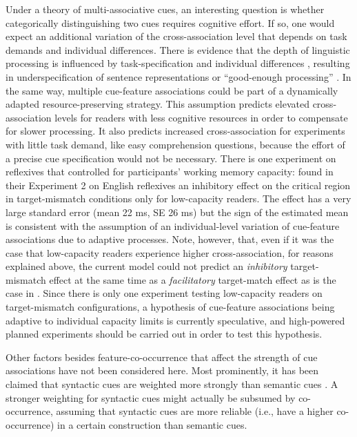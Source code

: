 \documentclass{cambridge7A}\usepackage[]{graphicx}\usepackage[]{color}
\begin{document}
Under a theory of multi-associative cues, an interesting question is whether categorically distinguishing two cues requires cognitive effort. If so, one would expect an additional variation of the cross-association level that depends on task demands and individual differences.
There is evidence that the depth of linguistic processing is influenced by task-specification \citep{SwetsDesmetClifton2008,LogacevVasishth2015} and individual differences \citep{Traxler2007,MalsburgVasishth2013,NicenboimEtAlFrontiers2016Capacity}, resulting in underspecification of sentence representations or ``good-enough processing'' \citep{FerreiraFerraroBailey2002}.
In the same way, multiple cue-feature associations could be part of a dynamically adapted resource-preserving strategy. 
This assumption predicts elevated cross-association levels for readers with less cognitive resources in order to compensate for slower processing. It also predicts increased cross-association for experiments with little task demand, like easy comprehension questions, because the effort of a precise cue specification would not be necessary.
There is one experiment on reflexives that controlled for participants' working memory capacity: \cite{CunningsFelser2013} found in their Experiment 2 on English reflexives an inhibitory effect on the critical region in target-mismatch conditions only for low-capacity readers. The effect has a very large standard error (mean 22 ms, SE 26 ms) but the sign of the estimated mean is consistent with the assumption of an individual-level variation of cue-feature associations due to adaptive processes. 
Note, however, that, even if it was the case that low-capacity readers experience higher cross-association, for reasons explained above, the current model could not predict an \textit{inhibitory} target-mismatch effect at the same time as a \textit{facilitatory} target-match effect as is the case in \cite{CunningsFelser2013}.
Since there is only one experiment testing low-capacity readers on target-mismatch configurations, a hypothesis of cue-feature associations being adaptive to individual capacity limits is currently speculative, and high-powered planned experiments should be carried out in order to test this hypothesis.

Other factors besides feature-co-occurrence that affect the strength of cue associations have not been considered here.
Most prominently, it has been claimed that syntactic cues are weighted more strongly than semantic cues  \citep[e.g.,][]{Nicol1988, Sturt2003,VanDyke2007,VanDykeMcElree2011}. 
A stronger weighting for syntactic cues might actually be subsumed by co-occurrence, assuming that syntactic cues are more reliable (i.e., have a higher co-occurrence) in a certain construction than semantic cues.
\end{document}
